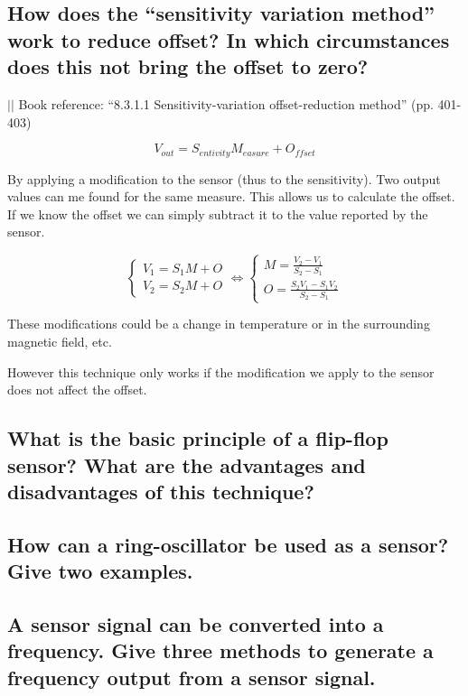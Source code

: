 \documentclass[10pt,a4paper]{article}
\newcommand{\bookref}[2]{\indent\indent\indent\indent $\vert\vert$ Book reference: ``#1'' (pp. #2) \newline}
\begin{document}
\subsection{How does the ``sensitivity variation method'' work to reduce offset? In which circumstances does this not bring the offset to zero?}

\bookref{8.3.1.1 Sensitivity-variation offset-reduction method}{401-403}

\[ V_{out} = S_{entivity}M_{easure} + O_{ffset} \]

By applying a modification to the sensor (thus to the sensitivity). Two output values can me found for the same measure. This allows us to calculate the offset. If we know the offset we can simply subtract it to the value reported by the sensor.

\[
\begin{cases} V_1 = S_1M + O  \\ V_2 = S_2M+O \end{cases} \iff
\begin{cases} M = \frac{V_2-V_1}{S_2-S_1}  \\ O = \frac{S_2 V_1 - S_1 V_2}{S_2 - S_1} \end{cases} 
\]

These modifications could be a change in temperature or in the surrounding magnetic field, etc.

However this technique only works if the modification we apply to the sensor does not affect the offset.

\subsection{What is the basic principle of a flip-flop sensor? What are the advantages and disadvantages of this technique?}


\subsection{How can a ring-oscillator be used as a sensor? Give two examples.}


\subsection{A sensor signal can be converted into a frequency. Give three methods to generate a frequency output from a
sensor signal.}
\end{document}
